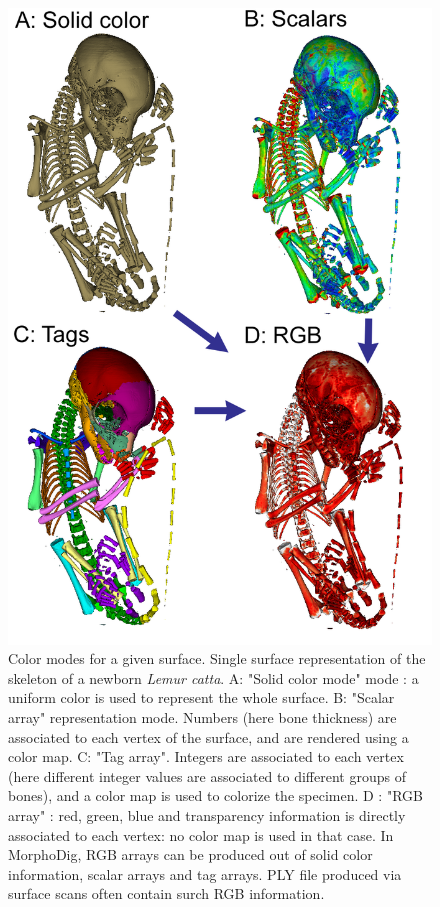 \begin{figure}
  \centering
  \includegraphics[scale=0.39]{images/04/4color_modes.png} 
	\caption{Color modes for a given surface. Single surface representation of the skeleton of a newborn \textit{Lemur catta}. A: "Solid color mode" mode : a uniform color is used to represent the whole surface. B: "Scalar array" representation mode. Numbers (here bone thickness) are associated to each vertex of the surface, and are rendered using a color map. C: "Tag array". Integers are associated to each vertex  (here different integer values are associated to different groups of bones), and a color map is used  to colorize the specimen. D : "RGB array" : red, green, blue and transparency information is directly associated to each vertex: no color map is used in that case. In MorphoDig, RGB arrays can be produced out of solid color information, scalar arrays and tag arrays. PLY file produced via surface scans often contain surch RGB information.}
\label{4color_modes}
 
\end{figure}